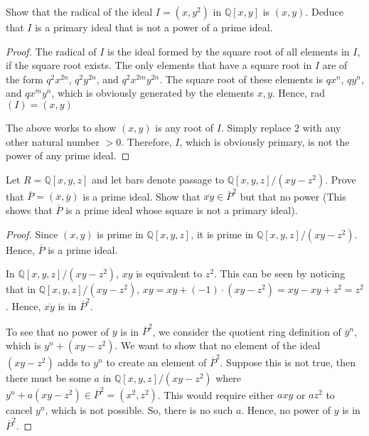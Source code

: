 \documentclass[10pt]{article}
\newenvironment{problem}[2][Problem]{\begin{trivlist}
		\item[\hskip \labelsep {\bfseries #1}\hskip \labelsep {\bfseries #2.}]}{\end{trivlist}}
\begin{document}
	\begin{problem}{1.11}
		Show that the radical of the ideal $I=(x,y^2)$ in $\mathbb{Q}[x,y]$ is $(x,y)$. Deduce that $I$ is a primary ideal that is not a power of a prime ideal.
		
		\begin{proof}
			The radical of $I$ is the ideal formed by the square root of all elements in $I$, if the square root exists. The only elements that have a square root in $I$ are of the form $q^2x^{2n}$, $q^2y^{2n}$, and $q^2x^{2m}y^{2n}$. The square root of these elements is $qx^{n}$, $qy^{n}$, and $qx^{m}y^{n}$, which is obviously generated by the elements $x,y$. Hence, rad$(I)=(x,y)$
			
			The above works to show $(x,y)$ is any root of $I$. Simply replace $2$ with any other natural number $>0$. Therefore, $I$, which is obviously primary, is not the power of any prime ideal.
		\end{proof}
	\end{problem}
	
	\begin{problem}{1.12}
		Let $R=\mathbb{Q}[x,y,z]$ and let bars denote passage to $\mathbb{Q}[x,y,z]/(xy-z^2)$. Prove that $\overline{P}=(\overline{x},\overline{y})$ is a prime ideal. Show that $\overline{xy} \in \overline{P}^2$ but that no power (This shows that $\overline{P}$ is a prime ideal whose square is not a primary ideal).
		\begin{proof}
			Since $(x,y)$ is prime in $\mathbb{Q}[x,y,z]$, it is prime in $\mathbb{Q}[x,y,z]/(xy-z^2)$. Hence, $\overline{P}$ is a prime ideal.
			
			In $\mathbb{Q}[x,y,z]/(xy-z^2)$, $xy$ is equivalent to $z^2$. This can be seen by noticing that in $\mathbb{Q}[x,y,z]/(xy-z^2)$, $xy = xy + (-1)\cdot(xy - z^2) = xy - xy + z^2 = z^2$. Hence, $\overline{xy}$ is in $\overline{P}^2$.
			
			To see that no power of $y$ is in $\overline{P}^2$, we consider the quotient ring definition of $\overline{y}^n$, which is $y^n + (xy - z^2)$. We want to show that no element of the ideal $(xy - z^2)$ adds to $y^n$ to create an element of $\overline{P}^2$. Suppose this is not true, then there must be some $a$ in  $\mathbb{Q}[x,y,z]/(xy-z^2)$ where $y^n + a(xy - z^2) \in \overline{P}^2 = (x^2, z^2)$. This would require either $axy$ or $az^2$ to cancel $y^n$, which is not possible. So, there is no such $a$. Hence, no power of $y$ is in $\overline{P}^2$.
		\end{proof}
	\end{problem}
	
\end{document}
